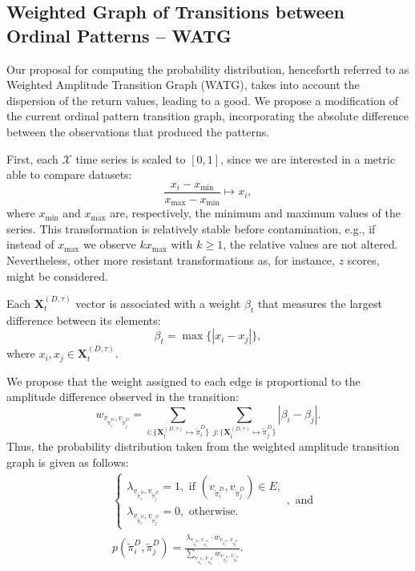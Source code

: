 \documentclass[journal]{IEEEtran}
\begin{document}
	\subsection{Weighted Graph of Transitions between Ordinal Patterns -- WATG}\label{WATG}
	
	Our proposal for computing the probability distribution, henceforth referred to as Weighted Amplitude Transition Graph (WATG), takes into account the dispersion of the return values, leading to a good.
	We propose a modification of the current ordinal pattern transition graph, incorporating the absolute difference between the observations that produced the patterns.
	
	First, each $\mathcal{X}$ time series is scaled to $[0, 1]$, since we are interested in a metric able to compare datasets:
	\begin{equation}
	\frac{x_i - x_{\min}}{x_{\max} - x_{\min}} \longmapsto x_i,
	\end{equation}
	where $x_{\min}$ and $x_{\max}$ are, respectively, the minimum and maximum values of the series.
	This transformation is relatively stable before contamination, e.g., if instead of $x_{\max}$ we observe $k x_{\max}$ with $k\geq 1$, the relative values are not altered. Nevertheless, other more resistant transformations as, for instance, $z$ scores, might be considered.
	
	Each $\mathbf{X}^{(D, \tau)}_t$ vector is associated with a weight $\beta_t$ that measures the largest difference between its elements:
	\begin{equation}
	\beta_t = \max\{|x_i - x_j|\},
	\end{equation}
	where $x_i, x_j \in \mathbf{X}^{(D, \tau)}_t$.
	
	We propose that the weight assigned to each edge is proportional to the amplitude difference observed in the transition:	
	\begin{equation}
	w_{v_{\widetilde \pi^D_i}, v_{\widetilde \pi^D_j}} =  \sum_{i : \{\mathbf{X}^{(D,\tau)}_t \mapsto \widetilde\pi^D_i\}} \sum_{j : \{\mathbf{X}^{(D,\tau)}_t \mapsto \widetilde\pi^D_j\}} |\beta_i - \beta_j| .
	\end{equation}
	Thus, the probability distribution taken from the weighted amplitude transition graph is given as follows:	
	\begin{align}
	&\left\{\begin{array}{l}
	\lambda_{v_{\widetilde\pi^D_i}, v_{\widetilde\pi^D_j}} = 1, \text{ if } (v_{\widetilde\pi^D_i}, v_{\widetilde\pi^D_j}) \in {E}, \\
	\lambda_{v_{\widetilde\pi^D_i}, v_{\widetilde\pi^D_j}} = 0, \text{ otherwise}.
	\end{array}\right., \text{ and} \\
	&p(\widetilde\pi^D_i, \widetilde\pi^D_j) = \frac{\lambda_{v_{\widetilde\pi^D_i}, v_{\widetilde\pi^D_j}} \cdot w_{v_{\widetilde\pi^D_i}, v_{\widetilde\pi^D_j}}}{\sum_{v_{\widetilde\pi^D_a}, v_{\widetilde\pi^D_b}} w_{v_{\widetilde\pi^D_a}, v_{\widetilde\pi^D_b}}}.
	\end{align}
	
\end{document}
